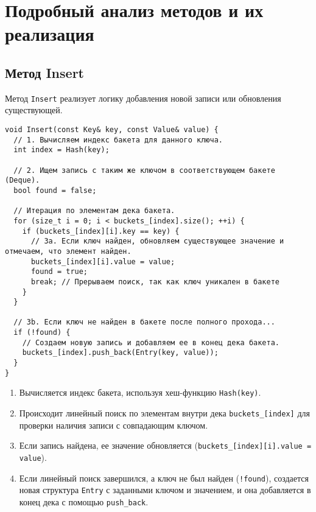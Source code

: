 \documentclass[a4paper,12pt]{article}
\begin{document}
\section{Подробный анализ методов и их реализация}

\subsection{Метод Insert}

Метод \texttt{Insert} реализует логику добавления новой записи или обновления существующей.

\begin{lstlisting}[style=cpp]
void Insert(const Key& key, const Value& value) {
  // 1. Вычисляем индекс бакета для данного ключа.
  int index = Hash(key);
  
  // 2. Ищем запись с таким же ключом в соответствующем бакете (Deque).
  bool found = false;
  
  // Итерация по элементам дека бакета.
  for (size_t i = 0; i < buckets_[index].size(); ++i) {
    if (buckets_[index][i].key == key) {
      // 3a. Если ключ найден, обновляем существующее значение и отмечаем, что элемент найден.
      buckets_[index][i].value = value;
      found = true;
      break; // Прерываем поиск, так как ключ уникален в бакете
    }
  }
  
  // 3b. Если ключ не найден в бакете после полного прохода...
  if (!found) {
    // Создаем новую запись и добавляем ее в конец дека бакета.
    buckets_[index].push_back(Entry(key, value));
  }
}
\end{lstlisting}

\begin{enumerate}
    \item Вычисляется индекс бакета, используя хеш-функцию \texttt{Hash(key)}.
    \item Происходит линейный поиск по элементам внутри дека \texttt{buckets\_[index]} для проверки наличия записи с совпадающим ключом.
    \item Если запись найдена, ее значение обновляется (\texttt{buckets\_[index][i].value = value}).
    \item Если линейный поиск завершился, а ключ не был найден (\texttt{!found}), создается новая структура \texttt{Entry} с заданными ключом и значением, и она добавляется в конец дека с помощью \texttt{push\_back}.
\end{enumerate}
\end{document}
